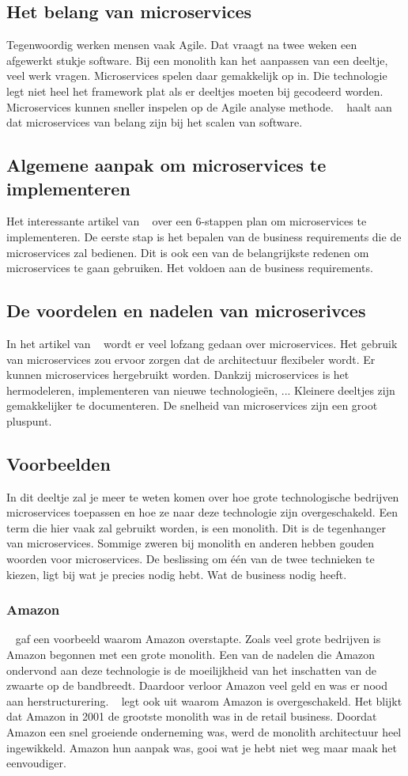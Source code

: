 \subsection{Het belang van microservices}
Tegenwoordig werken mensen vaak Agile. Dat vraagt na twee weken een afgewerkt stukje software. Bij een monolith kan het aanpassen van een deeltje, veel werk vragen. Microservices spelen daar gemakkelijk op in. Die technologie legt niet heel het framework plat als er deeltjes moeten bij gecodeerd worden. Microservices kunnen sneller inspelen op de Agile analyse methode.
~\cite{series2018} haalt aan dat microservices van belang zijn bij het scalen van software.
\subsection{Algemene aanpak om microservices te implementeren}
Het interessante artikel van ~\cite{Benetis2016} over een 6-stappen plan om microservices te implementeren.
De eerste stap is het bepalen van de business requirements die de microservices zal bedienen. Dit is ook een van de belangrijkste redenen om microservices te gaan gebruiken. Het voldoen aan de business requirements. 
\subsection{De voordelen en nadelen van microserivces}
In het artikel van ~\cite{series2018} wordt er veel lofzang gedaan over microservices. Het gebruik van microservices zou ervoor zorgen dat de architectuur flexibeler wordt. Er kunnen microservices hergebruikt worden. Dankzij microservices is het hermodeleren, implementeren van nieuwe technologieën, ... 
Kleinere deeltjes zijn gemakkelijker te documenteren. De snelheid van microservices zijn een groot pluspunt.
\subsection{Voorbeelden}
In dit deeltje zal je meer te weten komen over hoe grote technologische bedrijven microservices toepassen en hoe ze naar deze technologie zijn overgeschakeld.
Een term die hier vaak zal gebruikt worden, is een monolith. Dit is de tegenhanger van microservices. Sommige zweren bij monolith en anderen hebben gouden woorden voor microservices. De beslissing om één van de twee technieken te kiezen, ligt bij wat je precies nodig hebt. Wat de business nodig heeft. 
\subsubsection{Amazon}
~\cite{Mauersberger2017} gaf een voorbeeld waarom Amazon overstapte. Zoals veel grote bedrijven is Amazon begonnen met een grote monolith. Een van de nadelen die Amazon ondervond aan deze technologie is de moeilijkheid van het inschatten van de zwaarte op de bandbreedt. Daardoor verloor Amazon veel geld en was er nood aan herstructurering.
~\cite{Fulton2015} legt ook uit waarom Amazon is overgeschakeld. Het blijkt dat Amazon in 2001 de grootste monolith was in de retail business. Doordat Amazon een snel groeiende onderneming was, werd de monolith architectuur heel ingewikkeld. Amazon hun aanpak was, gooi wat je hebt niet weg maar maak het eenvoudiger. 
